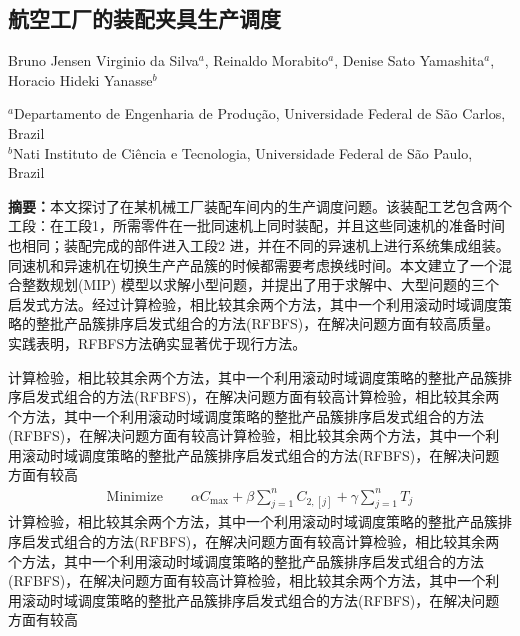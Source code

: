 \setcounter{figure}{0}
\setcounter{table}{0}
\newpage
\begin{Abstract}
\chapter*{航空工厂的装配夹具生产调度}
\begin{center}
\vspace{2mm}
{
 {\xiaosi Bruno Jensen Virginio da Silva$^a$,  Reinaldo Morabito$^a$, Denise Sato Yamashita$^a$,\\ Horacio Hideki Yanasse$^b$}

 {\xiaowu $^a$Departamento de Engenharia de Produção, Universidade Federal de São Carlos, Brazil\\
 $^b$Nati Instituto de Ciência e Tecnologia, Universidade Federal de São Paulo, Brazil}
}
\end{center}
{\songti
\noindent \xiaowu\textbf{摘要：}本文探讨了在某机械工厂装配车间内的生产调度问题。该装配工艺包含两个工段：在工段1，所需零件在一批同速机上同时装配，并且这些同速机的准备时间也相同；装配完成的部件进入工段2 进，并在不同的异速机上进行系统集成组装。同速机和异速机在切换生产产品簇的时候都需要考虑换线时间。本文建立了一个混合整数规划(MIP) 模型以求解小型问题，并提出了用于求解中、大型问题的三个启发式方法。经过计算检验，相比较其余两个方法，其中一个利用滚动时域调度策略的整批产品簇排序启发式组合的方法(RFBFS)，在解决问题方面有较高质量。实践表明，RFBFS方法确实显著优于现行方法。

}
\end{Abstract}
计算检验，相比较其余两个方法，其中一个利用滚动时域调度策略的整批产品簇排序启发式组合的方法(RFBFS)，在解决问题方面有较高计算检验，相比较其余两个方法，其中一个利用滚动时域调度策略的整批产品簇排序启发式组合的方法(RFBFS)，在解决问题方面有较高计算检验，相比较其余两个方法，其中一个利用滚动时域调度策略的整批产品簇排序启发式组合的方法(RFBFS)，在解决问题方面有较高
\begin{gather}
\text{Minimize}\qquad \alpha C_{\max}+\beta\sum_{j=1}^n C_{2,[j]}+\gamma\sum_{j=1}^n T_j \label{equ:8}
\end{gather}
计算检验，相比较其余两个方法，其中一个利用滚动时域调度策略的整批产品簇排序启发式组合的方法(RFBFS)，在解决问题方面有较高计算检验，相比较其余两个方法，其中一个利用滚动时域调度策略的整批产品簇排序启发式组合的方法(RFBFS)，在解决问题方面有较高计算检验，相比较其余两个方法，其中一个利用滚动时域调度策略的整批产品簇排序启发式组合的方法(RFBFS)，在解决问题方面有较高
